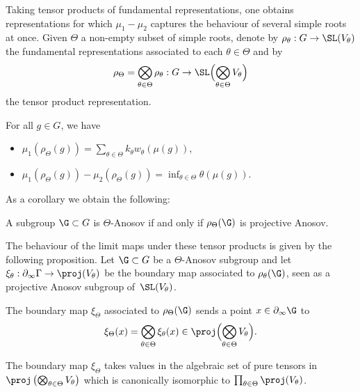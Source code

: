 Taking tensor products of fundamental representations, one obtains representations for which $\mu_1- \mu_2$ captures the behaviour of several simple roots at once. Given $\Theta$ a non-empty subset of simple roots, denote by $\rho_\theta: G \to \SL(V_\theta)$ the fundamental representations associated to each $\theta\in \Theta$ and by
\[\rho_\Theta = \bigotimes_{\theta \in \Theta} \rho_\theta : G \to \SL\Bigl( \bigotimes_{\theta \in \Theta} V_\theta\Bigr)\]
the tensor product representation.

\begin{prop} \label{prop - SimpleRootsTensorProduct}
For all $g\in G$, we have
\begin{itemize}
\item $\mu_1(\rho_\Theta(g)) = \sum_{\theta \in \Theta} k_\theta w_\theta(\mu(g))$,
\item $\mu_1(\rho_\Theta(g)) - \mu_2(\rho_\Theta(g)) = \inf_{\theta\in \Theta} \theta(\mu(g))$.
\end{itemize}
\end{prop}

As a corollary we obtain the following:
\begin{coro} \label{coro - anosov is projective anosov}
A subgroup $\G\subset G$ is $\Theta$-Anosov if and only if $\rho_\Theta(\G)$ is projective Anosov.
\end{coro}

The behaviour of the limit maps under these tensor products is given by the following proposition. Let $\G \subset G$ be a $\Theta$-Anosov subgroup and let $\xi_\theta: \partial_\infty \Gamma \to \proj(V_\theta)$ be the boundary map associated to $\rho_\theta(\G)$, seen as a projective Anosov subgroup of~$\SL(V_\theta)$.

\begin{prop} \label{prop - boundary map tensor product}
The boundary map $\xi_\Theta$ associated to $\rho_\Theta(\G)$ sends a point $x\in \partial_\infty \G$ to
\[\xi_\Theta(x) = \bigotimes_{\theta\in \Theta} \xi_\theta(x) \in \proj\Bigl(\bigotimes_{\theta\in \Theta} V_\theta\Bigr).\]
\end{prop}

\begin{rmk}
The boundary map $\xi_\Theta$ takes values in the algebraic set of pure tensors in $\proj\left(\bigotimes_{\theta\in \Theta} V_\theta\right)$ which is canonically isomorphic to $\prod_{\theta \in \Theta} \proj (V_\theta)$.
\end{rmk}

